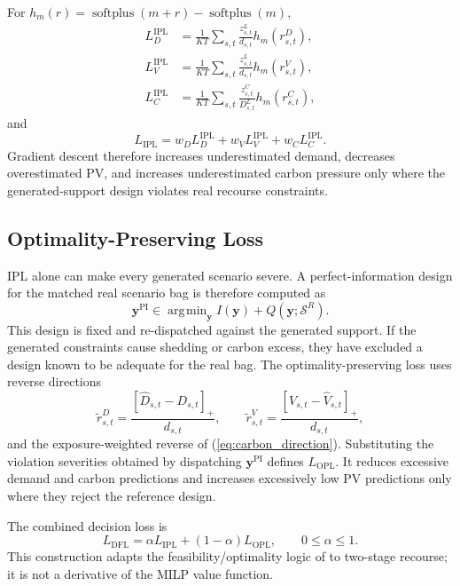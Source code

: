 \documentclass[times]{elsarticle}
\DeclareMathOperator*{\argmin}{\arg\!\min}
\begin{document}
For $h_m(r)=\operatorname{softplus}(m+r)-\operatorname{softplus}(m)$,
\begin{align}
L_D^{\mathrm{IPL}}&=\frac1{KT}\sum_{s,t}
\frac{z^L_{s,t}}{d_{s,t}}h_m(r^D_{s,t}),
\label{eq:ipl_load}\\
L_V^{\mathrm{IPL}}&=\frac1{KT}\sum_{s,t}
\frac{z^L_{s,t}}{d_{s,t}}h_m(r^V_{s,t}),
\label{eq:ipl_pv}\\
L_C^{\mathrm{IPL}}&=\frac1{KT}\sum_{s,t}
\frac{z^C_{s,t}}{D^L_{s,t}}h_m(r^C_{s,t}),
\label{eq:ipl_carbon}
\end{align}
and
\begin{equation}
L_{\mathrm{IPL}}=w_DL_D^{\mathrm{IPL}}+w_VL_V^{\mathrm{IPL}}
+w_CL_C^{\mathrm{IPL}}.
\label{eq:ipl}
\end{equation}
Gradient descent therefore increases underestimated demand, decreases
overestimated PV, and increases underestimated carbon pressure only where the
generated-support design violates real recourse constraints.

\subsection{Optimality-Preserving Loss}

IPL alone can make every generated scenario severe. A perfect-information
design for the matched real scenario bag is therefore computed as
\begin{equation}
\bm y^{\mathrm{PI}}\in\argmin_{\bm y}
I(\bm y)+Q(\bm y;\mathcal S^R).
\label{eq:pi_design}
\end{equation}
This design is fixed and re-dispatched against the generated support. If the
generated constraints cause shedding or carbon excess, they have excluded a
design known to be adequate for the real bag. The optimality-preserving loss
uses reverse directions
\begin{equation}
\widetilde r^D_{s,t}=
\frac{\left[\widehat D_{s,t}-D_{s,t}\right]_{+}}{d_{s,t}},\qquad
\widetilde r^V_{s,t}=
\frac{\left[V_{s,t}-\widehat V_{s,t}\right]_{+}}{d_{s,t}},
\label{eq:opl_directions}
\end{equation}
and the exposure-weighted reverse of (\ref{eq:carbon_direction}). Substituting
the violation severities obtained by dispatching $\bm y^{\mathrm{PI}}$ defines
$L_{\mathrm{OPL}}$. It reduces excessive demand and carbon predictions and
increases excessively low PV predictions only where they reject the reference
design.

The combined decision loss is
\begin{equation}
L_{\mathrm{DFL}}=\alpha L_{\mathrm{IPL}}+(1-\alpha)L_{\mathrm{OPL}},
\qquad 0\le\alpha\le1.
\label{eq:dfl_loss}
\end{equation}
This construction adapts the feasibility/optimality logic of
\cite{Mandi2025} to two-stage recourse; it is not a derivative of the MILP value
function.
\end{document}
